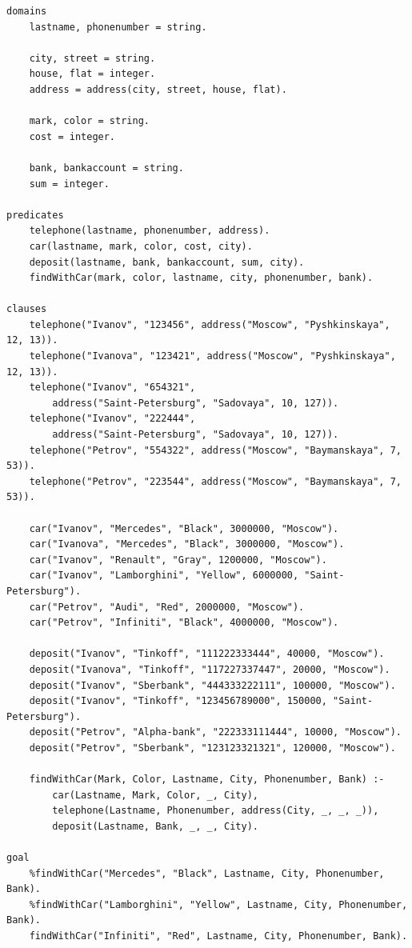 \begin{lstlisting}[caption=Текст программы]
domains
	lastname, phonenumber = string.

	city, street = string.
	house, flat = integer.
	address = address(city, street, house, flat).

	mark, color = string.
	cost = integer.

	bank, bankaccount = string.
	sum = integer.

predicates
	telephone(lastname, phonenumber, address).
	car(lastname, mark, color, cost, city).
	deposit(lastname, bank, bankaccount, sum, city).
	findWithCar(mark, color, lastname, city, phonenumber, bank).

clauses
	telephone("Ivanov", "123456", address("Moscow", "Pyshkinskaya", 12, 13)).
	telephone("Ivanova", "123421", address("Moscow", "Pyshkinskaya", 12, 13)).
	telephone("Ivanov", "654321",
		address("Saint-Petersburg", "Sadovaya", 10, 127)).
	telephone("Ivanov", "222444",
		address("Saint-Petersburg", "Sadovaya", 10, 127)).
	telephone("Petrov", "554322", address("Moscow", "Baymanskaya", 7, 53)).
	telephone("Petrov", "223544", address("Moscow", "Baymanskaya", 7, 53)).

	car("Ivanov", "Mercedes", "Black", 3000000, "Moscow").
	car("Ivanova", "Mercedes", "Black", 3000000, "Moscow").
	car("Ivanov", "Renault", "Gray", 1200000, "Moscow").
	car("Ivanov", "Lamborghini", "Yellow", 6000000, "Saint-Petersburg").
	car("Petrov", "Audi", "Red", 2000000, "Moscow").
	car("Petrov", "Infiniti", "Black", 4000000, "Moscow").

	deposit("Ivanov", "Tinkoff", "111222333444", 40000, "Moscow").
	deposit("Ivanova", "Tinkoff", "117227337447", 20000, "Moscow").
	deposit("Ivanov", "Sberbank", "444333222111", 100000, "Moscow").
	deposit("Ivanov", "Tinkoff", "123456789000", 150000, "Saint-Petersburg").
	deposit("Petrov", "Alpha-bank", "222333111444", 10000, "Moscow").
	deposit("Petrov", "Sberbank", "123123321321", 120000, "Moscow").

	findWithCar(Mark, Color, Lastname, City, Phonenumber, Bank) :-
		car(Lastname, Mark, Color, _, City),
		telephone(Lastname, Phonenumber, address(City, _, _, _)),
		deposit(Lastname, Bank, _, _, City).

goal
	%findWithCar("Mercedes", "Black", Lastname, City, Phonenumber, Bank).
	%findWithCar("Lamborghini", "Yellow", Lastname, City, Phonenumber, Bank).
	findWithCar("Infiniti", "Red", Lastname, City, Phonenumber, Bank).
\end{lstlisting}

